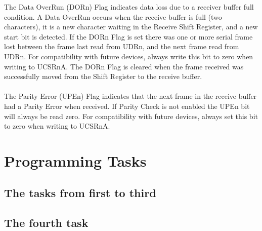 \documentclass[english]{article}
\begin{document}
The Data OverRun (DORn) Flag indicates data loss due to a receiver buffer full condition. A Data OverRun occurs when the receive buffer is full (two characters), it is a new character waiting in the Receive Shift Register, and a new start bit is detected. If the DORn Flag is set there was one or more serial frame lost between the frame last read from UDRn, and the next frame read from UDRn. For compatibility with future devices, always write this bit to zero when writing to UCSRnA. The DORn Flag is cleared when the frame received was successfully moved from the Shift Register to the receive buffer. \\\\
The Parity Error (UPEn) Flag indicates that the next frame in the receive buffer had a Parity Error when received. If Parity Check is not enabled the UPEn bit will always be read zero. For compatibility with future devices, always set this bit to zero when writing to UCSRnA.
\section{Programming Tasks}

\subsection{The tasks from first to third}



\subsection{The fourth task}

\end{document}
